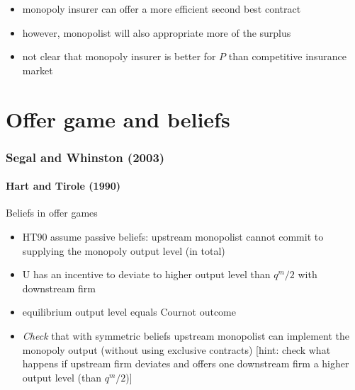 \documentclass[11pt,english]{beamer}
\begin{document}
\begin{frame}[allowframebreaks]
\begin{itemize}
\begin{itemize}
\item hence, if one observes that in reality people only contract with one insurer, this does not mean that exlusive contracts are (costlessly) available\\
\label{sec-7-4-10-1}%
\item further, this does not imply that lack of commitment has no
  effect on equilibrium outcome\\
\end{itemize}
\label{sec-7-4-10-2}%
\item monopoly insurer can offer a more efficient second best contract\\
\label{sec-7-4-10-3}%
\item however, monopolist will also appropriate more of the surplus\\
\label{sec-7-4-10-4}%
\item not clear that monopoly insurer is better for $P$ than competitive insurance market\\
\label{sec-7-4-10-5}%
\end{itemize} %
\end{frame}



\part[lecture 3]{Offer game and beliefs}

\section{Segal and Whinston (2003)}

\subsection{Hart and Tirole (1990)}

\begin{frame}{Beliefs in offer games}
  \begin{itemize}
  \item HT90 assume passive beliefs: upstream monopolist cannot commit
    to supplying the monopoly output level (in total)
  \item U has an incentive to deviate to higher output level than
    $q^m/2$ with downstream firm
  \item equilibrium output level equals Cournot outcome
  \item \emph{Check} that with symmetric beliefs upstream monopolist can
    implement the monopoly output (without using exclusive contracts)
    [hint: check what happens if upstream firm deviates and offers one
    downstream firm a higher output level (than $q^m/2$)]
  \end{itemize}
\end{frame}
\end{document}
